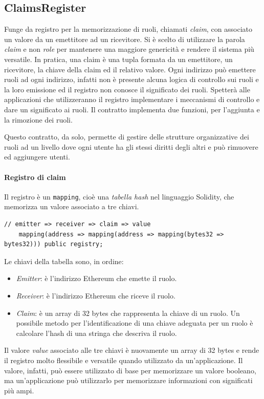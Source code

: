\subsection{ClaimsRegister}
\label{claims-register}
Funge da registro per la memorizzazione di ruoli, chiamati \emph{claim}, con associato un valore da un emettitore ad un ricevitore. Si è scelto di utilizzare la parola \emph{claim} e non \emph{role} per mantenere una maggiore genericità e rendere il sistema più versatile. In pratica, una claim è una tupla formata da un emettitore, un ricevitore, la chiave della claim ed il relativo valore. Ogni indirizzo può emettere ruoli ad ogni indirizzo, infatti non è presente alcuna logica di controllo sui ruoli e la loro emissione ed il registro non conosce il significato dei ruoli. Spetterà alle applicazioni che utilizzeranno il registro implementare i meccanismi di controllo e dare un significato ai ruoli. Il contratto implementa due funzioni, per l'aggiunta e la rimozione dei ruoli.

Questo contratto, da solo, permette di gestire delle strutture organizzative dei ruoli ad un livello dove ogni utente ha gli stessi diritti degli altri e può rimuovere ed aggiungere utenti.

\paragraph{Registro di claim}
Il registro è un \texttt{mapping}, cioè una \emph{tabella hash} nel linguaggio Solidity, che memorizza un valore associato a tre chiavi.

\noindent
\begin{lstlisting}[language=Solidity]
    // emitter => receiver => claim => value
    mapping(address => mapping(address => mapping(bytes32 => bytes32))) public registry;
\end{lstlisting}

Le chiavi della tabella sono, in ordine:
\begin{itemize}
    \item \emph{Emitter}: è l'indirizzo Ethereum che emette il ruolo.
    \item \emph{Receiver}: è l'indirizzo Ethereum che riceve il ruolo.
    \item \emph{Claim}: è un array di 32 bytes che rappresenta la chiave di un ruolo. Un possibile metodo per l'identificazione di una chiave adeguata per un ruolo è calcolare l'hash di una stringa che descriva il ruolo.
\end{itemize}
Il valore \emph{value} associato alle tre chiavi è nuovamente un array di 32 bytes e rende il registro molto flessibile e versatile quando utilizzato da un'applicazione. Il valore, infatti, può essere utilizzato di base per memorizzare un valore booleano, ma un'applicazione può utilizzarlo per memorizzare informazioni con significati più ampi.

